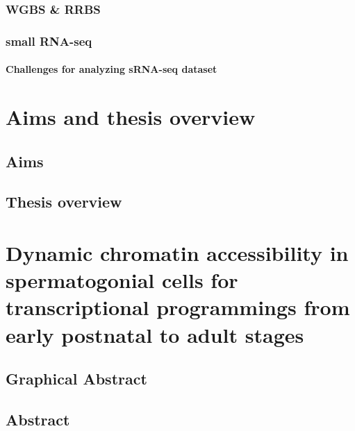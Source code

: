 \documentclass[12pt,twoside]{reedthesis}
\begin{document}
\hypertarget{wgbs-rrbs}{%
\subsection{WGBS \& RRBS}\label{wgbs-rrbs}}

\hypertarget{small-rna-seq}{%
\subsection{small RNA-seq}\label{small-rna-seq}}

\hypertarget{challenges-for-analyzing-srna-seq-dataset}{%
\subsubsection{Challenges for analyzing sRNA-seq dataset}\label{challenges-for-analyzing-srna-seq-dataset}}

\hypertarget{aims}{%
\chapter*{Aims and thesis overview}\label{aims}}

\hypertarget{aims-1}{%
\section{Aims}\label{aims-1}}

\hypertarget{thesis-overview}{%
\section{Thesis overview}\label{thesis-overview}}

\hypertarget{developmental}{%
\chapter{Dynamic chromatin accessibility in spermatogonial cells for transcriptional programmings from early postnatal to adult stages}\label{developmental}}

\newpage

\hypertarget{graphical-abstract}{%
\section{Graphical Abstract}\label{graphical-abstract}}

\newpage

\hypertarget{abstract}{%
\section{Abstract}\label{abstract}}
\end{document}
